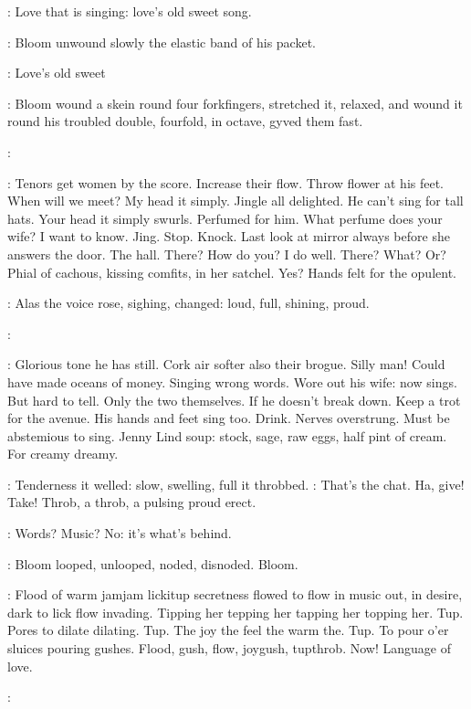 \BloomInt:
Love that is singing:
love's old sweet song.

:
Bloom unwound slowly
the elastic band of his packet.

\BloomInt:
Love's old sweet

:
Bloom
wound a skein round four forkfingers,
stretched it,
relaxed,
and wound it
round his troubled double,
fourfold,
in octave,
gyved them fast.

\simon:

\BloomInt:
Tenors get women by the score.
Increase their flow.
Throw flower at
his feet.
When will we meet?
My head it simply.
Jingle all delighted.
He
can't sing for tall hats.
Your head it simply swurls.
Perfumed for him.
What perfume does your wife?
I want to know.
Jing.
Stop.
Knock.
Last look
at mirror always before she answers the door.
The hall.
There?
How do you?
I do well.
There?
What?
Or?
Phial of cachous,
kissing comfits,
in her
satchel.
Yes?
Hands felt for the opulent.

:
Alas the voice rose,
sighing,
changed:
loud,
full,
shining,
proud.

\simon:

\BloomInt:
Glorious tone he has still.
Cork air softer also their brogue.
Silly man!
Could have made oceans of money.
Singing wrong words.
Wore out his
wife:
now sings.
But hard to tell.
Only the two themselves.
If he doesn't
break down.
Keep a trot for the avenue.
His hands and feet sing too.
Drink.
Nerves overstrung.
Must be abstemious to sing.
Jenny Lind soup:
stock,
sage,
raw eggs,
half pint of cream.
For creamy dreamy.

:
Tenderness it welled:
slow,
swelling,
full it throbbed.
\BloomInt:
That's the chat.
Ha,
give!
Take!
Throb,
a throb,
a pulsing proud erect.

\BloomInt:
Words?
Music?
No:
it's what's behind.

:
Bloom looped,
unlooped,
noded,
disnoded.
Bloom.

\BloomInt:
Flood of warm jamjam lickitup secretness flowed to flow in
music out,
in desire,
dark to lick flow invading.
Tipping her tepping her
tapping her topping her.
Tup.
Pores to dilate dilating.
Tup.
The joy the
feel the warm the.
Tup.
To pour o'er sluices pouring gushes.
Flood,
gush,
flow,
joygush,
tupthrob.
Now!
Language of love.

\simon:

